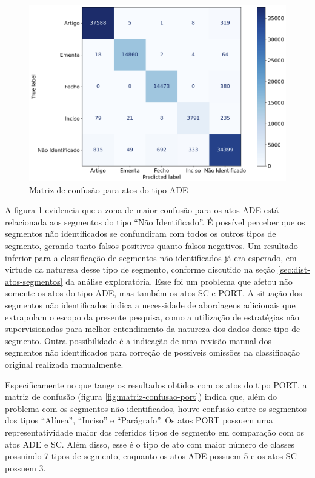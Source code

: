 \begin{figure}[h]
	\caption{Matriz de confusão para atos do tipo ADE}
	\center
	\label{fig:matriz-confusao-ade}
	\includegraphics[scale=0.45]{resultados/matriz-confusao-ade.png}
	\fdp
\end{figure}

A figura \ref{fig:matriz-confusao-ade} evidencia que a zona de maior confusão para os atos ADE está relacionada aos segmentos do tipo ``Não Identificado''. É possível perceber que os segmentos não identificados se confundiram com todos os outros tipos de segmento, gerando tanto falsos positivos quanto falsos negativos. Um resultado inferior para a classificação de segmentos não identificados já era esperado, em virtude da natureza desse tipo de segmento, conforme discutido na seção \ref{sec:dist-atos-segmentos} da análise exploratória. Esse foi um problema que afetou não somente os atos do tipo ADE, mas também os atos SC e PORT. A situação dos segmentos não identificados indica a necessidade de abordagens adicionais que extrapolam o escopo da presente pesquisa, como a utilização de estratégias não supervisionadas para melhor entendimento da natureza dos dados desse tipo de segmento. Outra possibilidade é a indicação de uma revisão manual dos segmentos não identificados para correção de possíveis omissões na classificação original realizada manualmente.

Especificamente no que tange os resultados obtidos com os atos do tipo PORT, a matriz de confusão (figura \ref{fig:matriz-confusao-port}) indica que, além do problema com os segmentos não identificados, houve confusão entre os segmentos dos tipos ``Alínea'', ``Inciso'' e ``Parágrafo''. Os atos PORT possuem uma representatividade maior dos referidos tipos de segmento em comparação com os atos ADE e SC. Além disso, esse é o tipo de ato com maior número de classes possuindo 7 tipos de segmento, enquanto os atos ADE possuem 5 e os atos SC possuem 3.

